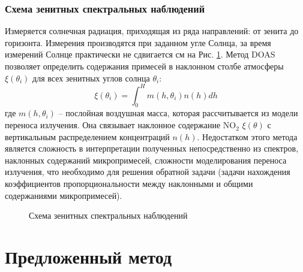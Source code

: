 \documentclass[a4paper,14pt]{article}
\theoremstyle{plain}
\theoremstyle{definition}
\theoremstyle{remark}
\begin{document}
\subsubsection{Схема зенитных спектральных наблюдений}
Измеряется солнечная радиация, приходящая из ряда направлений: 
от зенита до горизонта. 
Измерения производятся при заданном угле Солнца, 
за время измерений Солнце практически не сдвигается
см на Рис. \ref{pic:scheme}.
Метод DOAS позволяет определить содержания примесей в 
наклонном столбе атмосферы $\xi(\theta_i)$ 
для всех зенитных углов солнца $\theta_i$:
\[
\xi(\theta_i) = 
\int_0^H
m(h, \theta_i) n(h) dh
\]где $m(h, \theta_i)$ -- 
послойная воздушная масса, 
которая рассчитывается из модели
переноса излучения. 
Она связывает наклонное содержание $\text{NO}_2$ 
$\xi(\theta)$ 
с вертикальным распределением концентраций $n(h)$. 
Недостатком этого метода является сложность в интерпретации
полученных непосредственно из спектров, 
наклонных содержаний микропримесей, сложности моделирования
переноса излучения, что необходимо для решения обратной 
задачи (задачи нахождения коэффициентов пропорциональности 
между наклонными и общими содержаниями микропримесей).
\begin{figure}[h]
\noindent{}
\caption{Схема зенитных спектральных наблюдений}
\label{pic:scheme}
\end{figure}
\clearpage
\section{Предложенный метод}
\end{document}
